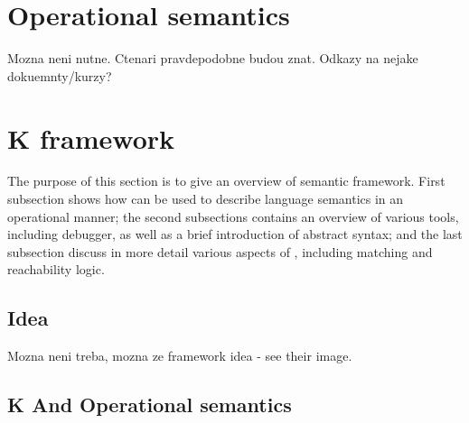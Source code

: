 \documentclass{fithesis3}
\begin{document}
\section{Operational semantics}
Mozna neni nutne. Ctenari pravdepodobne budou znat. Odkazy na nejake dokuemnty/kurzy?


\section{K framework}

The purpose of this section is to give an overview of \K semantic framework. First subsection shows how \K can be used to describe language semantics in an operational manner; the second subsections contains an overview of various \K tools, including debugger, as well as a brief introduction of \K abstract syntax; and the last subsection discuss in more detail various aspects of \K, including matching and reachability logic.

\subsection{Idea}
Mozna neni treba, mozna ze 
\K framework idea - see their image.



% 




\subsection{K And Operational semantics}




\end{document}
